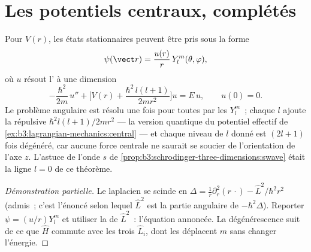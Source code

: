 \section{Les potentiels centraux, complétés}

\begin{theorem}\label{thm:b3:quantum-angular-momentum:radial}
Pour $V(r)$, les états stationnaires peuvent être pris sous la forme
\[
\psi(\vect r) = \frac{u(r)}{r}\,Y_l^m(\theta, \varphi) ,
\]
où $u$ résout l' à une dimension
\[
-\frac{\hbar^2}{2m}\,u'' + \Big[V(r) +
\frac{\hbar^2\,l(l+1)}{2mr^2}\Big]u = E\,u , \qquad u(0) = 0 .
\]
Le problème angulaire est résolu une fois pour toutes par les $Y_l^m$~;
chaque $l$ ajoute la \emph{} répulsive
$\hbar^2l(l+1)/2mr^2$ --- la version quantique du potentiel effectif
de \cref{ex:b3:lagrangian-mechanics:central} --- et chaque niveau de
$l$ donné est $(2l+1)$ fois dégénéré, car aucune force centrale ne
saurait se soucier de l'orientation de l'axe $z$. L'astuce de l'onde
$s$ de \cref{prop:b3:schrodinger-three-dimensions:swave} était la
ligne $l = 0$ de ce théorème.
\end{theorem}

\begin{proof}[Démonstration partielle]
Le laplacien se scinde en $\Delta = \tfrac1r\partial_r^2(r\,\cdot) -
\hat L^2/\hbar^2r^2$ (admis~; c'est l'énoncé selon lequel $\hat L^2$
est la partie angulaire de $-\hbar^2\Delta$). Reporter
$\psi = (u/r)Y_l^m$ et utiliser la  de $\hat L^2$~:
l'équation annoncée. La dégénérescence suit de ce que $\hat H$ commute
avec les trois $\hat
L_i$, dont les  déplacent $m$ sans changer l'énergie.
\end{proof}

